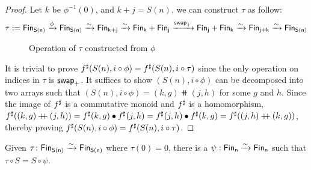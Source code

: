 \begin{proof}
    Let $k$ be $\phi^{-1}(0)$, and $k + j = S(n)$, we can construct $\tau$ as follow:
    \begin{align*}
        \tau := \Fin[S(n)] \xto{\phi} \Fin[S(n)] \xto{\sim} \Fin[k+j] \xto{\sim} \Fin[k] + \Fin[j]
        \xto{\term{swap}_{+}} \Fin[j] + \Fin[k] \xto{\sim} \Fin[j+k] \xto{\sim} \Fin[S(n)]
    \end{align*}

    \begin{figure}[H]
        \centering
        \hspace{1em}
        \caption{Operation of $\tau$ constructed from $\phi$}
        \label{fig:enter-label}
    \end{figure}

    It is trivial to prove ${f}^{\sharp}(S(n), i \circ \phi) = {f}^{\sharp}(S(n), i \circ \tau)$ since the only
    operation on indices in $\tau$ is $\operatorname{\mathsf{swap}}_{+}$. It suffices to show $(S(n), i \circ \phi)$
    can be decomposed into two arrays such that $(S(n), i \circ \phi) = (k, g) \doubleplus (j, h)$
    for some $g$ and $h$. Since the image of ${f}^{\sharp}$ is a commutative monoid and ${f}^{\sharp}$ is a homomorphism,
    ${f}^{\sharp}((k, g) \mathbin{+\kern -0.4em+} (j, h)) = {f}^{\sharp}(k, g) \mathbin{\bullet} {f}^{\sharp}(j, h) = {f}^{\sharp}(j, h) \mathbin{\bullet} {f}^{\sharp}(k, g) =
        {f}^{\sharp}((j, h) \mathbin{+\kern -0.4em+} (k, g))$, thereby proving ${f}^{\sharp}(S(n), i \circ \phi) = {f}^{\sharp}(S(n), i \circ \tau)$.

\end{proof}

\begin{lemma}\label{bag:punch}
    Given $\tau\colon \Fin[S(n)]\xto{\sim}\Fin[S(n)]$ where $\tau(0) = 0$,
    there is a $\psi : \Fin[n] \xto{\sim} \Fin[n]$ such that $\tau \circ S = S \circ \psi$.
\end{lemma}

